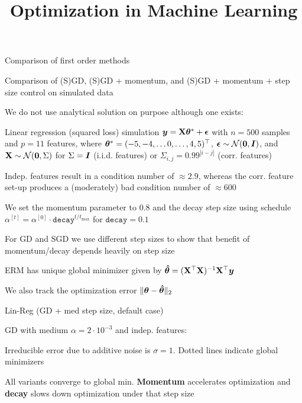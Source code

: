 \documentclass[11pt,compress,t,notes=noshow, xcolor=table]{beamer}
\title{Optimization in Machine Learning}
\begin{document}

\begin{framei}[fs=small]{Comparison of first order methods}
\item Comparison of (S)GD, (S)GD + momentum, and (S)GD + momentum + step size control on simulated data
\item We do not use analytical solution on purpose although one exists:
\item Linear regression (squared loss) simulation $\bm{y} = \mathbf{X}\bm{\theta}^{\ast} + \bm{\epsilon}$ with $n=500$ samples and $p=11$ features, where $\bm{\theta}^{\ast}=(-5,-4,\ldots0,\ldots,4,5)^{\top}$, $\bm{\epsilon} \sim \mathcal{N}(\mathbf{0}, \bm{I})$, and $\mathbf{X} \sim \mathcal{N}(\mathbf{0}, \Sigma)$ for $\Sigma=\bm{I}$ (i.i.d. features) or $\Sigma_{i,j}=0.99^{|i-j|}$ (corr. features)
\item Indep. features result in a condition number of $\approx 2.9$, whereas the corr. feature set-up produces a (moderately) bad condition number of $\approx 600$
\item We set the momentum parameter to $0.8$ and the decay step size using schedule $\alpha^{[t]}=\alpha^{[0]} \cdot \texttt{decay}^{t/t_{\text{max}}}$ for $\texttt{decay}=0.1$
\item For GD and SGD we use different step sizes to show that benefit of momentum/decay depends heavily on step size
\item ERM has unique global minimizer given by $\bm{\hat\theta} = (\mathbf{X}^{\top}\mathbf{X})^{-1}\mathbf{X}^{\top} \bm{y}$
\item We also track the optimization error $\Vert \bm{\theta} - \bm{\hat\theta} \Vert_2$
\end{framei}


\begin{framei}[fs=small]{Lin-Reg (GD + med step size, default case)}
\item GD with medium $\alpha=2\cdot10^{-3}$ and indep. features:
\item Irreducible error due to additive noise is $\sigma=1$. Dotted lines indicate global minimizers
\item All variants converge to global min. \textbf{Momentum} accelerates optimization and \textbf{decay} slows down optimization under that step size
\end{framei}
\end{document}
